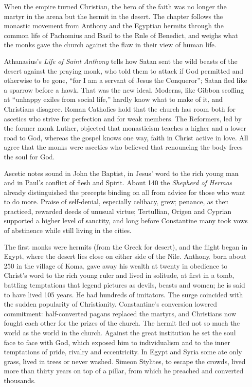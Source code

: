 
\begin{inbrief}
When the empire turned Christian, the hero of the faith was no longer the martyr in the arena but the
hermit in the desert. The chapter follows the monastic movement from Anthony and the Egyptian hermits
through the common life of Pachomius and Basil to the Rule of Benedict, and weighs what the monks gave
the church against the flaw in their view of human life.
\end{inbrief}

Athanasius's \emph{Life of Saint Anthony} tells how Satan sent the wild beasts of the desert against
the praying monk, who told them to attack if God permitted and otherwise to be gone, ``for I am a
servant of Jesus the Conqueror''; Satan fled like a sparrow before a hawk. That was the new ideal.
Moderns, like Gibbon scoffing at ``unhappy exiles from social life,'' hardly know what to make of it,
and Christians disagree. Roman Catholics hold that the church has room both for ascetics who strive
for perfection and for weak members. The Reformers, led by the former monk Luther, objected that
monasticism teaches a higher and a lower road to God, whereas the gospel knows one way, faith
in Christ active in love. All agree that the monks were ascetics who believed that renouncing the
body frees the soul for God.

Ascetic notes sound in John the Baptist, in Jesus' word to the rich young man and in Paul's conflict
of flesh and Spirit. About 140 the \emph{Shepherd of Hermas} already distinguished the precepts
binding on all from advice for those who want to do more. Praise of self-denial, especially celibacy,
grew; penance, as then practiced, rewarded deeds of unusual virtue; Tertullian, Origen and Cyprian
supported a higher level of sanctity, and long before Constantine many took vows of abstinence while
still living in the cities.

The first monks were hermits (from the Greek for desert), and the flight began in Egypt, where the
desert lies close on either side of the Nile. Anthony, born about 250 in the village of Koma, gave
away his wealth at twenty in obedience to Christ's word to the rich young ruler and lived in solitude,
at first in a tomb, battling temptations that legend pictures as devils, beasts and women; he is said
to have lived 105 years. He had hundreds of imitators. The surge coincided with the sudden popularity
of Christianity. Constantine's conversion lowered commitment: half-converted pagans replaced the
martyrs, and Christians now fought each other for the prizes of the church. The hermit fled not so
much the world as the world in the church. Against the great institution he set the soul face to face
with God, which exposed him to individualism and to the inner temptations of pride, rivalry and
eccentricity. In Egypt and Syria some ate only grass, lived in trees or never washed. Simeon
Stylites, to escape the crowds, lived more than thirty years on top of a pillar, from which he
preached and converted thousands.

